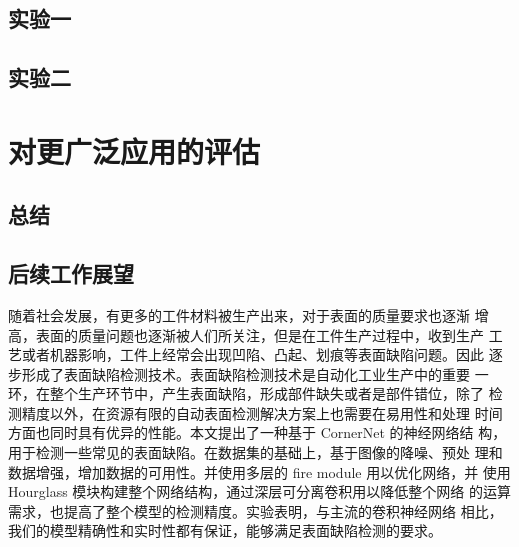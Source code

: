 \section{实验一}

\section{实验二}


\chapter{对更广泛应用的评估}
\section{总结}
\section{后续工作展望}


随着社会发展，有更多的⼯件材料被⽣产出来，对于表⾯的质量要求也逐渐 增⾼，表⾯的质量问题也逐渐被⼈们所关注，但是在⼯件⽣产过程中，收到⽣产 ⼯艺或者机器影响，⼯件上经常会出现凹陷、凸起、划痕等表⾯缺陷问题。因此 逐步形成了表⾯缺陷检测技术。表⾯缺陷检测技术是⾃动化⼯业⽣产中的重要 ⼀环，在整个⽣产环节中，产⽣表⾯缺陷，形成部件缺失或者是部件错位，除了 检测精度以外，在资源有限的⾃动表⾯检测解决⽅案上也需要在易⽤性和处理 时间⽅⾯也同时具有优异的性能。本⽂提出了⼀种基于 CornerNet 的神经⽹络结 构，⽤于检测⼀些常⻅的表⾯缺陷。在数据集的基础上，基于图像的降噪、预处 理和数据增强，增加数据的可⽤性。并使⽤多层的 fire module ⽤以优化⽹络，并 使⽤ Hourglass 模块构建整个⽹络结构，通过深层可分离卷积⽤以降低整个⽹络 的运算需求，也提⾼了整个模型的检测精度。实验表明，与主流的卷积神经⽹络
相⽐，我们的模型精确性和实时性都有保证，能够满⾜表⾯缺陷检测的要求。

